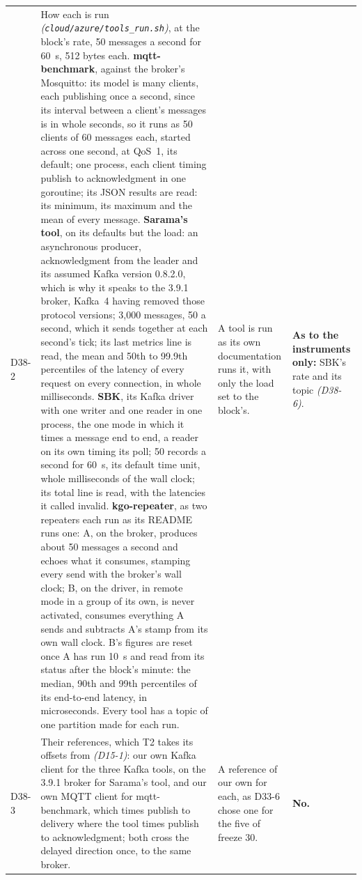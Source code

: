 \documentclass[11pt]{article}
\newcommand{\gl}[1]{{\color{soft}\itshape\small (#1)}}
\begin{document}
{\begin{longtable}{@{}p{1.1cm} >{\raggedright\arraybackslash}p{6.1cm} >{\raggedright\arraybackslash}p{6.0cm} >{\raggedright\arraybackslash}p{2.2cm}@{}}
D38-2 & How each is run \gl{\texttt{cloud/azure/tools\_run.sh}}, at the block's rate, 50 messages a second for 60~s, 512 bytes each. \textbf{mqtt-benchmark}, against the broker's Mosquitto: its model is many clients, each publishing once a second, since its interval between a client's messages is in whole seconds, so it runs as 50 clients of 60 messages each, started across one second, at QoS~1, its default; one process, each client timing publish to acknowledgment in one goroutine; its JSON results are read: its minimum, its maximum and the mean of every message. \textbf{Sarama's tool}, on its defaults but the load: an asynchronous producer, acknowledgment from the leader and its assumed Kafka version 0.8.2.0, which is why it speaks to the 3.9.1 broker, Kafka~4 having removed those protocol versions; 3,000 messages, 50 a second, which it sends together at each second's tick; its last metrics line is read, the mean and 50th to 99.9th percentiles of the latency of every request on every connection, in whole milliseconds. \textbf{SBK}, its Kafka driver with one writer and one reader in one process, the one mode in which it times a message end to end, a reader on its own timing its poll; 50 records a second for 60~s, its default time unit, whole milliseconds of the wall clock; its total line is read, with the latencies it called invalid. \textbf{kgo-repeater}, as two repeaters each run as its README runs one: A, on the broker, produces about 50 messages a second and echoes what it consumes, stamping every send with the broker's wall clock; B, on the driver, in remote mode in a group of its own, is never activated, consumes everything A sends and subtracts A's stamp from its own wall clock. B's figures are reset once A has run 10~s and read from its status after the block's minute: the median, 90th and 99th percentiles of its end-to-end latency, in microseconds. Every tool has a topic of one partition made for each run. & A tool is run as its own documentation runs it, with only the load set to the block's. & \textbf{As to the instruments only:} SBK's rate and its topic \gl{D38-6}. \\
D38-3 & Their references, which T2 takes its offsets from \gl{D15-1}: our own Kafka client for the three Kafka tools, on the 3.9.1 broker for Sarama's tool, and our own MQTT client for mqtt-benchmark, which times publish to delivery where the tool times publish to acknowledgment; both cross the delayed direction once, to the same broker. & A reference of our own for each, as D33-6 chose one for the five of freeze 30. & \textbf{No.} \\

\end{longtable}}
\end{document}
